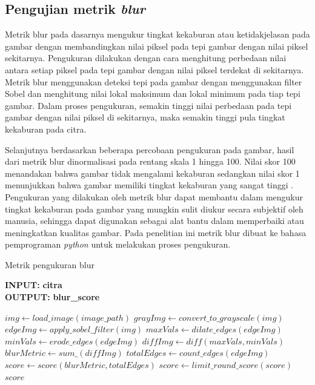 \subsection{Pengujian metrik \textit{blur}}
\hspace{1,2cm}
Metrik blur pada dasarnya mengukur tingkat kekaburan atau ketidakjelasan pada gambar dengan membandingkan nilai piksel pada tepi gambar dengan nilai piksel sekitarnya. Pengukuran dilakukan dengan cara menghitung perbedaan nilai antara setiap piksel pada tepi gambar dengan nilai piksel terdekat di sekitarnya. Metrik blur menggunakan deteksi tepi pada gambar dengan menggunakan filter Sobel dan menghitung nilai lokal maksimum dan lokal minimum pada tiap tepi gambar. Dalam proses pengukuran, semakin tinggi nilai perbedaan pada tepi gambar dengan nilai piksel di sekitarnya, maka semakin tinggi pula tingkat kekaburan pada citra.

Selanjutnya berdasarkan beberapa percobaan pengukuran pada gambar, hasil dari metrik blur dinormalisasi pada rentang skala 1 hingga 100. Nilai skor 100 menandakan bahwa gambar tidak mengalami kekaburan sedangkan nilai skor 1 menunjukkan bahwa gambar memiliki tingkat kekaburan yang sangat tinggi . Pengukuran yang dilakukan oleh metrik blur dapat membantu dalam mengukur tingkat kekaburan pada gambar yang mungkin sulit diukur secara subjektif oleh manusia, sehingga dapat digunakan sebagai alat bantu dalam memperbaiki atau meningkatkan kualitas gambar. Pada penelitian ini metrik blur dibuat ke bahasa pemprograman \textit{python} untuk melakukan proses pengukuran.


\begin{algorithm}
\caption{Metrik pengukuran blur}
\label{metrik-blur}
	\begin{flushleft}
	\textbf{INPUT:} \textbf{citra}\\
	\textbf{OUTPUT:}	\textbf{blur\_score}
		\end{flushleft}
	
		\begin{algorithmic}[1]
		\State $img \gets load\_image(image\_path)$ 
		\State $grayImg \gets convert\_to\_grayscale(img)$ 
		\State $edgeImg \gets apply\_sobel\_filter(img)$ 
		\State $maxVals \gets dilate\_edges(edgeImg)$ 
		\State $minVals \gets erode\_edges(edgeImg)$ 
		\State $diffImg \gets diff(maxVals, minVals)$ 
		\State $blurMetric \gets sum\_(diffImg)$ 
		\State $totalEdges \gets count\_edges(edgeImg)$ 
		\State $score \gets score(blurMetric, totalEdges)$ 
		\State $score \gets limit\_round\_score(score)$ 
		\State \Return $score$
		\EndFunction
	\end{algorithmic}
\end{algorithm}

